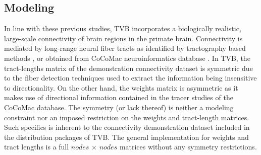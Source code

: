 \documentclass{bioinfo}
\begin{document}
  \subsection{Modeling}

    In line with these previous studies, TVB incorporates a biologically
    realistic, large-scale connectivity of brain regions in the primate brain.
    Connectivity is mediated by long-range neural fiber tracts as identified by
    tractography based methods \citep{Hagmann_2008, Honey_2009, Bastiani_2012},
    or obtained from CoCoMac neuroinformatics database \citep{Koetter_2004,
    Koetter_2005, Bakker_2012}. In TVB, the  tract-lengths matrix of the
    demonstration connectivity dataset is symmetric due to the fiber detection
    techniques used to extract the information being insensitive to
    directionality. On the other hand, the weights matrix is asymmetric as it
    makes use of directional information contained in the tracer studies of the
    CoCoMac database. The symmetry (or lack thereof) is neither a modeling
    constraint nor an imposed restriction on the weights and tract-length matrices.
    Such specifics is inherent to the connectivity demonstration dataset included in
    the distribution packages of TVB. The general implementation for weights and
    tract lengths is a full $nodes\,\times\,nodes$ matrices without any symmetry restrictions.
\end{document}
